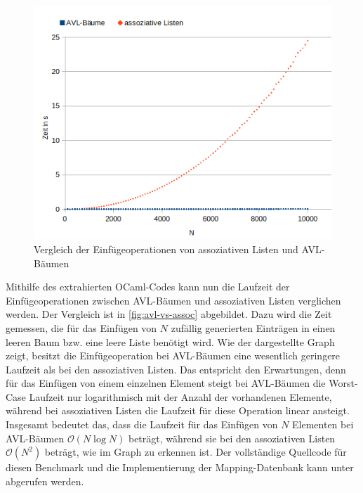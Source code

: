 \documentclass[a4paper, parskip]{scrartcl}
\begin{document}
\begin{figure}
  \includegraphics{bench}
  \caption{Vergleich der Einfügeoperationen von assoziativen Listen und AVL-Bäumen}
  \label{fig:avl-vs-assoc}
\end{figure}
Mithilfe des extrahierten OCaml-Codes kann nun die Laufzeit der Einfügeoperationen zwischen AVL-Bäumen und assoziativen Listen verglichen werden.
Der Vergleich ist in \autoref{fig:avl-vs-assoc} abgebildet.
Dazu wird die Zeit gemessen, die für das Einfügen von $N$ zufällig generierten Einträgen in einen leeren Baum bzw. eine leere Liste benötigt wird.
Wie der dargestellte Graph zeigt, besitzt die Einfügeoperation bei AVL-Bäumen eine wesentlich geringere Laufzeit als bei den assoziativen Listen.
Das entspricht den Erwartungen, denn für das Einfügen von einem einzelnen Element steigt bei AVL-Bäumen die Worst-Case Laufzeit nur logarithmisch mit der Anzahl der vorhandenen Elemente, während bei assoziativen Listen die Laufzeit für diese Operation linear ansteigt.
Insgesamt bedeutet das, dass die Laufzeit für das Einfügen von $N$ Elementen bei AVL-Bäumen $\mathcal{O}(N\log{}N)$ beträgt, während sie bei den assoziativen Listen $\mathcal{O}(N^2)$ beträgt, wie im Graph zu erkennen ist.
Der vollständige Quellcode für diesen Benchmark und die Implementierung der Mapping-Datenbank kann unter \autocite{source} abgerufen werden.
\end{document}
